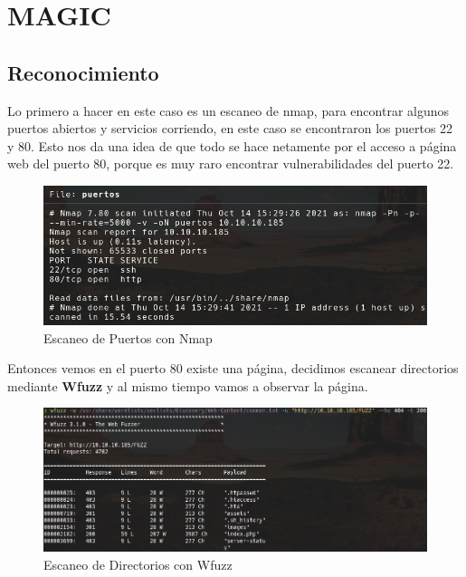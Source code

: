 \documentclass{article}
\begin{document}
\clearpage
\section{MAGIC}
\subsection{Reconocimiento}
Lo primero a hacer en este caso es un escaneo de nmap, para encontrar algunos puertos abiertos y servicios corriendo, en este caso se encontraron los puertos 22 y 80. Esto nos da una idea de que todo se hace netamente por el acceso a página web del puerto 80, porque es muy raro encontrar vulnerabilidades del puerto 22.
\begin{figure}[h]
	\center 
	\includegraphics[width=\textwidth]{images/magic/nmap.png}
	\caption{Escaneo de Puertos con Nmap}
\end{figure}
Entonces vemos en el puerto 80 existe una página, decidimos escanear directorios mediante \textbf{Wfuzz} y al mismo tiempo vamos a observar la página.
\begin{figure}[h]
	\center 
	\includegraphics[width=\textwidth]{images/magic/wfuzz.png}
	\caption{Escaneo de Directorios con Wfuzz}
\end{figure}

\clearpage
\end{document}
